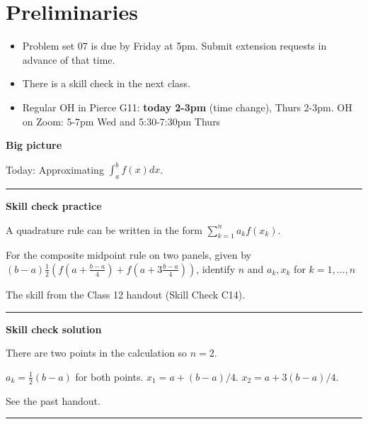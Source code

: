 \documentclass[12pt,letterpaper,noanswers]{exam}
\begin{document}
 \pdfpageheight 11in 
  \pdfpagewidth 8.5in

\noindent 

\section*{Preliminaries}

\begin{itemize}
\itemsep0pt
\item Problem set 07 is due by Friday at 5pm.  Submit extension requests in advance of that time.
\item There is a skill check in the next class.
\item Regular OH in Pierce G11: \textbf{today 2-3pm} (time change), Thurs 2-3pm.  OH on Zoom: 5-7pm Wed and 5:30-7:30pm Thurs
\end{itemize}


\noindent\textbf{Big picture}

Today: Approximating $\int_{a}^{b}f(x)dx$.

\vspace{0.2cm}
\hrule
\vspace{0.2cm}

\noindent \textbf{Skill check practice}
\begin{questions}
\item A quadrature rule can be written in the form $\sum\limits_{k=1}^n a_k f(x_k)$.

For the composite midpoint rule on two panels, given by $(b-a)\frac{1}{2}\left(f(a + \frac{b-a}{4})+ f(a + 3\frac{b-a}{4})\right)$, identify $n$ and $a_k, x_k$ for $k=1,...,n$

\item The skill from the Class 12 handout (Skill Check C14).
\end{questions}


\vspace{0.2cm}
\hrule
\vspace{0.2cm}

\noindent \textbf{Skill check solution}
\begin{questions}

\item There are two points in the calculation so $n = 2$.

$a_k = \frac{1}{2}(b-a)$ for both points.  $x_1 = a+(b-a)/4$. $x_2 = a+3(b-a)/4$.
\item See the past handout.
\end{questions}
\vspace{0.2cm}
\hrule
\vspace{0.2cm}
\end{document}
